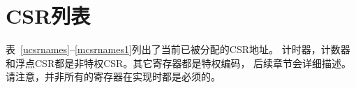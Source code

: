 \section{CSR列表
    }


表~\ref{ucsrnames}--\ref{mcsrnames1}列出了当前已被分配的CSR地址。
计时器，计数器和浮点CSR都是非特权CSR。其它寄存器都是特权编码，
后续章节会详细描述。请注意，并非所有的寄存器在实现时都是必须的。

